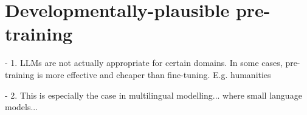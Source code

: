 


\section{Developmentally-plausible pre-training}\label{sec:12-plausiblepretraining}


- 1. LLMs are not actually appropriate for certain domains. In some cases, pre-training is more effective and cheaper than fine-tuning. E.g. humanities

- 2. This is especially the case in multilingual modelling... where small language models...


